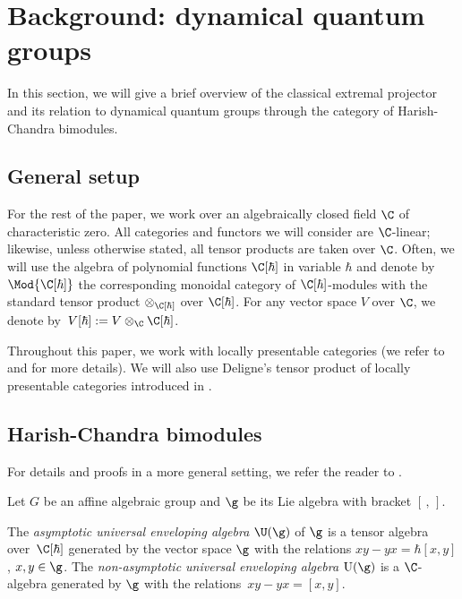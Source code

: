 	\section{Background: dynamical quantum groups}
	\label{sect::dynamical_quantum_groups}
	
	\renewcommand{\theequation}{\arabic{section}.\arabic{equation}}
	
	In this section, we will give a brief overview of the classical extremal projector and its relation to dynamical quantum groups through the category of Harish-Chandra bimodules.
	
	\subsection{General setup}
	\label{subsect::general_setup}
	For the rest of the paper, we work over an algebraically closed field $\C$ of characteristic zero. All categories and functors we will consider are $\C$-linear; likewise, unless otherwise stated, all tensor products are taken over $\C$. Often, we will use the algebra of polynomial functions $\C[\hbar]$ in variable $\hbar$ and denote by $\Mod{\C[\hbar]}$ the corresponding monoidal category of $\C[\hbar]$-modules with the standard tensor product $\otimes_{\C[\hbar]}$ over $\C[\hbar]$. For any vector space $V$ over $\C$, we denote by~${V[\hbar]:= V \otimes_{\C} \C[\hbar]}$.
	
Throughout this paper, we work with locally presentable categories (we refer to \cite{AdamekRosicky} and \cite[Section 2]{BCJF} for more details). We will also use Deligne's tensor product of locally presentable categories introduced in \cite{Deligne}.
	
	
	\subsection{Harish-Chandra bimodules}
	\label{subsect::hc_bimod}
	For details and proofs in a more general setting, we refer the reader to \cite[Section 2]{KalmykovSafronov}.
	
	Let $G$ be an affine algebraic group and $\g$ be its Lie algebra with bracket $[\,,\,]$.
	
	\begin{Definition}
		\label{def::asympt_uea}
		The \emph{asymptotic universal enveloping algebra} $\U(\g)$ of $\g$ is a tensor algebra over~$\C[\hbar]$ generated by the vector space $\g$ with the relations
$
		xy - yx = \hbar [x,y]$, $ x,y\in \g$.
		The \emph{non-asymptotic universal enveloping algebra} $\mathrm{U}(\g)$ is a $\C$-algebra generated by $\g$ with the relations~${xy - yx = [x,y]}$.
	\end{Definition}
	
